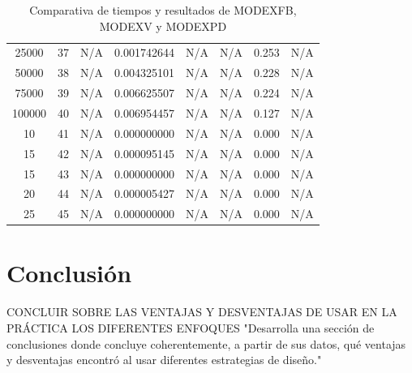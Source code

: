 \documentclass[letterpaper,10pt]{article}
\begin{document}
\begin{table}[H]
{\begin{tabular}{|c|c|c|c|c|c|c|c|}
      25000 & 37  & N/A        & \cellcolor{sgreen}0.001742644 & N/A & N/A    & \cellcolor{syellow}0.253  & N/A    \\
      50000 & 38  & N/A        & \cellcolor{sgreen}0.004325101 & N/A & N/A    & \cellcolor{syellow}0.228  & N/A    \\
      75000 & 39  & N/A        & \cellcolor{sgreen}0.006625507 & N/A & N/A    & \cellcolor{syellow}0.224  & N/A    \\
      100000 & 40 & N/A        & \cellcolor{sgreen}0.006954457 & N/A & N/A    & \cellcolor{syellow}0.127  & N/A    \\
      10   & 41   & N/A        & \cellcolor{sgreen}0.000000000 & N/A & N/A    & \cellcolor{syellow}0.000  & N/A    \\
      15   & 42   & N/A        & \cellcolor{sgreen}0.000095145 & N/A & N/A    & \cellcolor{syellow}0.000  & N/A    \\
      15   & 43   & N/A        & \cellcolor{sgreen}0.000000000 & N/A & N/A    & \cellcolor{syellow}0.000  & N/A    \\
      20   & 44   & N/A        & \cellcolor{sgreen}0.000005427 & N/A & N/A    & \cellcolor{syellow}0.000  & N/A    \\
      25   & 45   & N/A        & \cellcolor{sgreen}0.000000000 & N/A & N/A    & \cellcolor{syellow}0.000  & N/A    \\
      \hline
  \end{tabular}
  }
  \caption{Comparativa de tiempos y resultados de MODEXFB, MODEXV y MODEXPD}
  \label{tab:modex_comparativa}
\end{table}
\section{Conclusión}
\label{sec:conclusion}
CONCLUIR SOBRE LAS VENTAJAS Y DESVENTAJAS DE USAR EN LA PRÁCTICA LOS DIFERENTES ENFOQUES
"Desarrolla una sección de conclusiones donde concluye coherentemente, a partir de sus datos, qué ventajas y desventajas encontró al usar diferentes estrategias de diseño."
\end{document}
